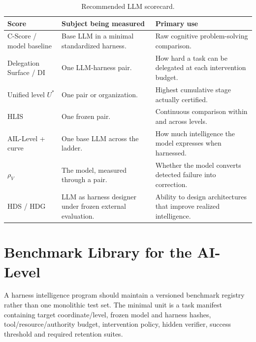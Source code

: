 \documentclass[11pt]{article}
\theoremstyle{definition}
\newcommand{\rhov}{\ensuremath{\rho_V}}
\begin{document}
\begin{table}[!htbp]
\centering\small
\begin{tabularx}{\textwidth}{@{}lYY@{}}
\toprule
Score & Subject being measured & Primary use \\
\midrule
C-Score / model baseline & Base LLM in a minimal standardized harness. & Raw cognitive problem-solving comparison. \\
Delegation Surface / DI & One LLM-harness pair. & How hard a task can be delegated at each intervention budget. \\
Unified level $U^{*}$ & One pair or organization. & Highest cumulative stage actually certified. \\
HLIS & One frozen pair. & Continuous comparison within and across levels. \\
AIL-Level + curve & One base LLM across the ladder. & How much intelligence the model expresses when harnessed. \\
\rhov{} & The model, measured through a pair. & Whether the model converts detected failure into correction. \\
HDS / HDG & LLM as harness designer under frozen external evaluation. & Ability to design architectures that improve realized intelligence. \\
\bottomrule
\end{tabularx}
\caption{Recommended LLM scorecard.}
\label{tab:scorecard}
\end{table}

\section{Benchmark Library for the AI-Level}

A harness intelligence program should maintain a versioned benchmark registry rather than one monolithic test set. The minimal unit is a task manifest containing target coordinate/level, frozen model and harness hashes, tool/resource/authority budget, intervention policy, hidden verifier, success threshold and required retention suites.
\end{document}
